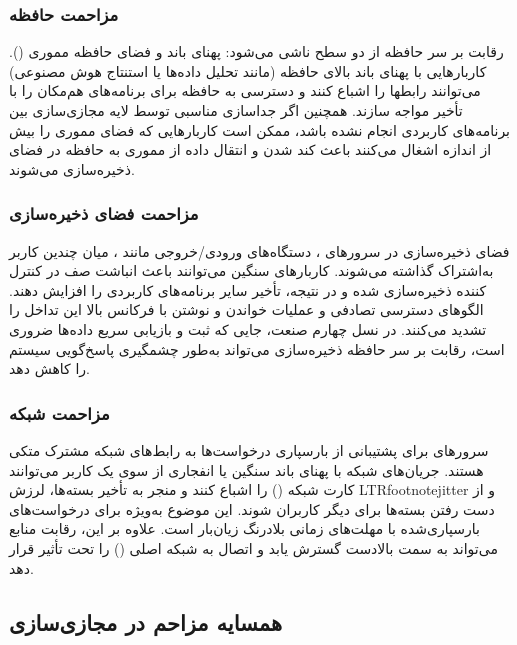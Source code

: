 \subsubsection{مزاحمت حافظه}

رقابت بر سر حافظه از دو سطح ناشی می‌شود: پهنای باند و فضای حافظه مموری (). کاربارهایی با پهنای باند بالای حافظه (مانند تحلیل داده‌ها یا استنتاج هوش مصنوعی) می‌توانند رابطها را اشباع کنند و دسترسی به حافظه برای برنامه‌های هم‌مکان را با تأخیر مواجه سازند. همچنین اگر جداسازی مناسبی توسط لایه مجازی‌سازی بین برنامه‌های کاربردی انجام نشده باشد، ممکن است کاربارهایی که فضای مموری را بیش از اندازه اشغال می‌کنند باعث کند شدن و انتقال داده از مموری به حافظه  در فضای ذخیره‌سازی  می‌شوند.

\subsubsection{مزاحمت فضای ذخیره‌سازی}

فضای ذخیره‌سازی در سرورهای ، دستگاه‌های ورودی/خروجی مانند ، میان چندین کاربر به‌اشتراک گذاشته می‌شوند. کاربارهای سنگین  می‌توانند باعث انباشت صف در کنترل کننده ذخیره‌سازی شده و در نتیجه، تأخیر  سایر برنامه‌های کاربردی را افزایش دهند. الگوهای دسترسی تصادفی و عملیات خواندن و نوشتن با فرکانس بالا این تداخل را تشدید می‌کنند. در نسل چهارم صنعت، جایی که ثبت و بازیابی سریع داده‌ها ضروری است، رقابت بر سر حافظه ذخیره‌سازی می‌تواند به‌طور چشمگیری پاسخ‌گویی سیستم را کاهش دهد.

\subsubsection{مزاحمت شبکه}

سرورهای  برای پشتیبانی از بارسپاری درخواست‌ها به رابط‌های شبکه مشترک متکی هستند. جریان‌های شبکه با پهنای باند سنگین یا انفجاری از سوی یک کاربر می‌توانند کارت شبکه () را اشباع کنند و منجر به تأخیر بسته‌ها، لرزش LTRfootnote{jitter} و از دست رفتن بسته‌ها برای دیگر کاربران شوند. این موضوع به‌ویژه برای درخواست‌های بارسپاری‌شده با مهلت‌های زمانی بلادرنگ زیان‌بار است. علاوه بر این، رقابت منابع می‌تواند به سمت بالادست گسترش یابد و اتصال به شبکه اصلی () را تحت تأثیر قرار دهد.

\subsection{همسایه مزاحم در مجازی‌سازی}

